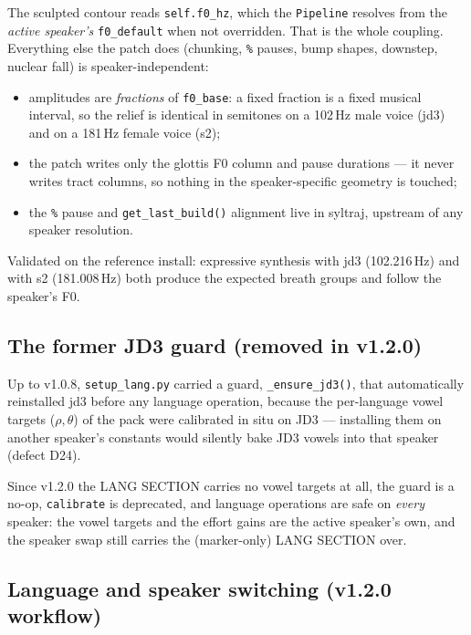 \documentclass[11pt,a4paper]{article}
\newcommand{\ks}[1]{\texttt{#1}}
\begin{document}
The sculpted contour reads \texttt{self.f0\_hz}, which the
\texttt{Pipeline} resolves from the \emph{active speaker's}
\texttt{f0\_default} when not overridden. That is the whole
coupling. Everything else the patch does (chunking, \ks{\%}
pauses, bump shapes, downstep, nuclear fall) is
speaker-independent:

\begin{itemize}[itemsep=1pt]
\item amplitudes are \emph{fractions} of \texttt{f0\_base}: a
  fixed fraction is a fixed musical interval, so the relief is
  identical in semitones on a 102\,Hz male voice (jd3) and on a
  181\,Hz female voice (s2);
\item the patch writes only the glottis F0 column and pause
  durations --- it never writes tract columns, so nothing in the
  speaker-specific geometry is touched;
\item the \ks{\%} pause and \texttt{get\_last\_build()} alignment
  live in syltraj, upstream of any speaker resolution.
\end{itemize}

Validated on the reference install: expressive synthesis with
jd3 (102.216\,Hz) and with s2 (181.008\,Hz) both produce the
expected breath groups and follow the speaker's F0.

\subsection{The former JD3 guard (removed in v1.2.0)}

Up to v1.0.8, \texttt{setup\_lang.py} carried a guard,
\texttt{\_ensure\_jd3()}, that automatically reinstalled jd3
before any language operation, because the per-language vowel
targets ($\rho, \theta$) of the pack were calibrated in situ on
JD3 --- installing them on another speaker's constants would
silently bake JD3 vowels into that speaker (defect D24).

Since v1.2.0 the LANG SECTION carries no vowel targets at all, the
guard is a no-op, \texttt{calibrate} is deprecated, and language
operations are safe on \emph{every} speaker: the vowel targets
and the effort gains are the active speaker's own, and the
speaker swap still carries the (marker-only) LANG SECTION over.

\subsection{Language and speaker switching (v1.2.0 workflow)}
\end{document}
